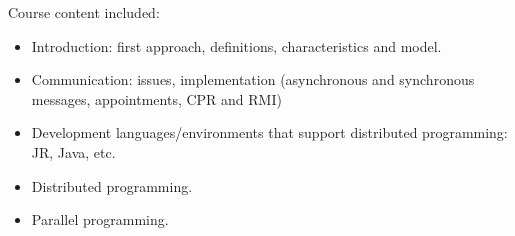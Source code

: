 Course content included:
\begin{itemize}
    \item Introduction: first approach, definitions, characteristics and model.
    \item Communication: issues, implementation (asynchronous and synchronous messages, appointments, CPR and RMI)
    \item Development languages/environments that support distributed programming: JR, Java, etc.
    \item Distributed programming.
    \item Parallel programming.
\end{itemize}